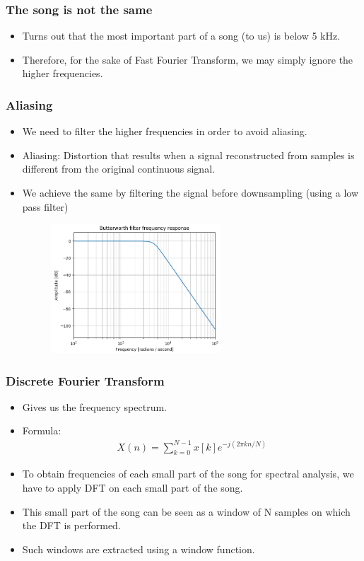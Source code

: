 \documentclass{beamer}
\begin{document}
\begin{frame}
    \frametitle{The song is not the same}   
    \begin{itemize}
        \item Turns out that the most important part of a song (to us) is below \alert{5 kHz}.
        \item Therefore, for the sake of Fast Fourier Transform, we may simply ignore the higher frequencies.
    \end{itemize}
\end{frame}
    
\begin{frame}[t]
    \frametitle{Aliasing}   
    \begin{itemize}
        \item We need to filter the higher frequencies in order to avoid aliasing.
        \item \alert{Aliasing}: Distortion that results when a signal reconstructed from samples is different from the original continuous signal.
        \item We achieve the same by filtering the signal before downsampling (using a low pass filter)
        \begin{figure}
            \includegraphics[width=0.6\textwidth]{lowpassfilter.png}
        \end{figure}
    \end{itemize}
\end{frame}

\begin{frame}
    \frametitle{Discrete Fourier Transform}
    \begin{itemize}
        \item Gives us the frequency spectrum.
        \item Formula: 
            \begin{align*}
                X(n) = \sum_{k=0}^{N-1} x[k] e^{-j(2\pi kn/N)}
            \end{align*}
        \item To obtain frequencies of each small part of the song for spectral analysis, we have to apply DFT on each small part of the song.
        \item This small part of the song can be seen as a \alert{window of N samples} on which the DFT is performed.
        \item Such windows are extracted using a \alert{window function}.
    \end{itemize}
\end{frame}
\end{document}

